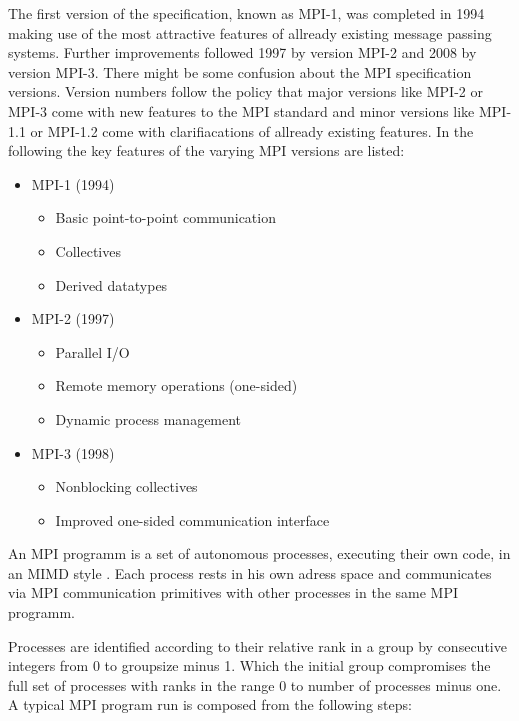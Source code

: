 The first version of the specification, known as MPI-1, was completed
in 1994 making use of the most attractive features of allready
existing message passing systems.  Further improvements followed 1997
by version MPI-2 and 2008 by version MPI-3. There might be some
confusion about the MPI specification versions. Version numbers follow
the policy that major versions like MPI-2 or MPI-3 come with new
features to the MPI standard and minor versions like MPI-1.1 or
MPI-1.2 come with clarifiacations of allready existing features. In
the following the key features of the varying MPI versions are listed:

\begin{itemize}
  \item MPI-1 (1994)
    \begin{itemize}
      \item Basic point-to-point communication
      \item Collectives
      \item Derived datatypes
    \end{itemize}
  \item MPI-2 (1997)
    \begin{itemize}
      \item Parallel I/O
      \item Remote memory operations (one-sided)
      \item Dynamic process management
    \end{itemize}
  \item MPI-3 (1998)
    \begin{itemize}
      \item Nonblocking collectives
      \item Improved one-sided communication interface
    \end{itemize}
\end{itemize}

An MPI programm is a set of autonomous processes, executing their own
code, in an MIMD style \cite{Flynn:1972:COE:1952456.1952459}. Each
process rests in his own adress space and communicates via MPI
communication primitives with other processes in the same MPI
programm.

Processes are identified according to their relative rank in a group
by consecutive integers from 0 to groupsize minus 1. Which the initial
group compromises the full set of processes with ranks in the range 0
to number of processes minus one. A typical MPI program run is composed from
the following steps:

